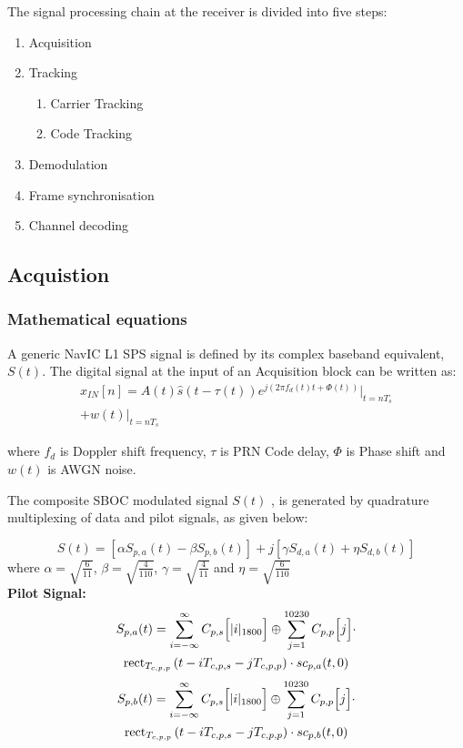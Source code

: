 \documentclass[conference]{IEEEtran}
\begin{document}
The signal processing chain at the receiver is divided into five steps:
\begin{enumerate}
	\item Acquisition
	\item Tracking
	\begin{enumerate}
		\item Carrier Tracking
		\item Code Tracking
	\end{enumerate}
	\item Demodulation
	\item Frame synchronisation
	\item Channel decoding
\end{enumerate}

\subsection{Acquistion}
\subsubsection{Mathematical equations}

A generic NavIC L1 SPS signal is defined by its complex baseband equivalent, 
$S(t)$. The digital signal at the input of an Acquisition block can be written as:
\begin{multline}
	x_{IN}[n]=A(t)\hat s (t-\tau(t))e^{j(2 \pi f_d(t)t+\Phi(t))}\bigg|_{t=nT_s} \\ 
    +w(t)\bigg|_{t=nT_s}
\end{multline}

\noindent where $f_d$ is Doppler shift frequency, $\tau$ is PRN Code delay, $\Phi$ is Phase shift
and $w(t)$ is AWGN noise. 

\noindent The composite SBOC modulated signal $S(t)$ \cite{b1},\cite{b2} is generated by quadrature multiplexing of data and pilot signals, as given below:

\begin{equation}
S(t) = [\alpha S_{p,a}(t) - \beta S_{p,b}(t)] + j[\gamma S_{d,a}(t) + \eta S_{d,b}(t)]
\label{eq:composite_signal}
\end{equation}
\noindent where $\alpha = \sqrt{\frac{6}{11}}$, $\beta = \sqrt{\frac{4}{110}}$, $\gamma = \sqrt{\frac{4}{11}}$ and $\eta = \sqrt{\frac{6}{110}}$ \\

\noindent\textbf{Pilot Signal:}
\begin{multline}
S_{p,a}(t) = \sum_{i=-\infty}^{\infty} C_{p,s}\Bigl[|i|_{1800}\Bigr] \oplus \sum_{j=1}^{10230}C_{p,p}\Bigl[j\Bigr]\cdot \\
             \text{rect}_{T_{c,p,p}} \left( t - iT_{c,p,s} - jT_{c,p,p}\right) \cdot sc_{p,a}(t, 0)
\label{eq:sp_a}
\end{multline}
\begin{multline}
S_{p,b}(t) =    \sum_{i=-\infty}^{\infty} C_{p,s}\Bigl[|i|_{1800}\Bigr] \oplus \sum_{j=1}^{10230}C_{p,p}\Bigl[j\Bigr]\cdot \\
    \text{rect}_{T_{c,p,p}} \left( t - iT_{c,p,s} - jT_{c,p,p}\right) \cdot sc_{p,b}(t, 0)
\label{eq:sp_b}
\end{multline}
\end{document}
